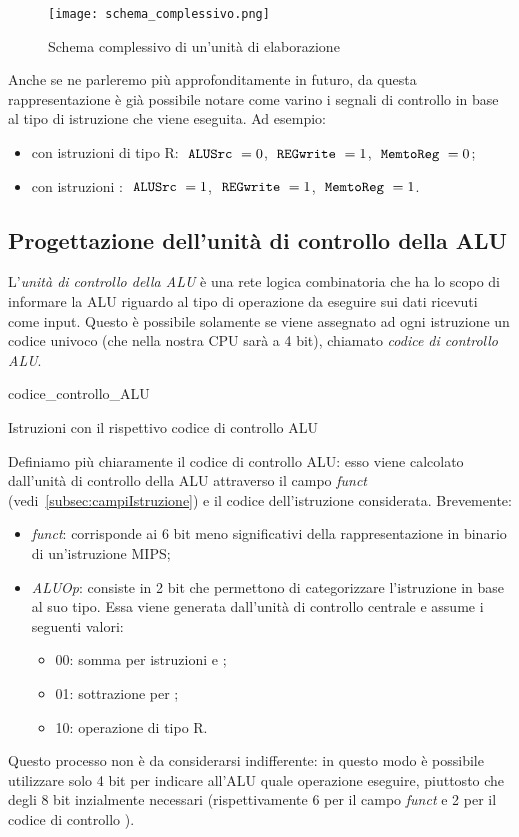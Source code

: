 \begin{figure}[H]
	\centering
	\texttt{[image: schema\_complessivo.png]}
	\caption{Schema complessivo di un'unità di elaborazione}
\end{figure}
Anche se ne parleremo più approfonditamente in futuro, da questa rappresentazione è già possibile notare come varino i segnali di controllo in base al tipo di istruzione che viene eseguita. Ad esempio:
\begin{itemize}
	\item con istruzioni di tipo R: \(\textrm{ \texttt{ALUSrc} }=0\), \(\textrm{ \texttt{REGwrite} }= 1\), \(\textrm{ \texttt{MemtoReg} }=0\);
	\item con istruzioni : \(\textrm{ \texttt{ALUSrc} }=1\), \(\textrm{ \texttt{REGwrite} }= 1\), \(\textrm{ \texttt{MemtoReg} }=1\).
\end{itemize}

\subsection{Progettazione dell'unità di controllo della ALU}
L'\emph{unità di controllo della ALU} è una rete logica combinatoria che ha lo scopo di informare la ALU riguardo al tipo di operazione da eseguire sui dati ricevuti come input. Questo è possibile solamente se viene assegnato ad ogni istruzione un codice univoco (che nella nostra CPU sarà a 4 bit), chiamato \emph{codice di controllo ALU}.

\begin{table}[H]
	\centering
	{codice_controllo_ALU}
	\caption{Istruzioni con il rispettivo codice di controllo ALU}
\end{table}
Definiamo più chiaramente il codice di controllo ALU: esso viene calcolato dall'unità di controllo della ALU attraverso il campo \emph{funct} (vedi~\ref{subsec:campiIstruzione}) e il codice  dell'istruzione considerata. Brevemente:
\begin{itemize}
	\item \emph{funct}: corrisponde ai 6 bit meno significativi della rappresentazione in binario di un'istruzione MIPS;
	\item \emph{ALUOp}: consiste in 2 bit che permettono di categorizzare l'istruzione in base al suo tipo. Essa viene generata dall'unità di controllo centrale e assume i seguenti valori:
	\begin{itemize}
		\item 00: somma per istruzioni  e ;
		\item 01: sottrazione per ;
		\item 10: operazione di tipo R.
	\end{itemize}
\end{itemize}
Questo processo non è da considerarsi indifferente: in questo modo è possibile utilizzare solo 4 bit per indicare all'ALU quale operazione eseguire, piuttosto che degli 8 bit inzialmente necessari (rispettivamente 6 per il campo \emph{funct} e 2 per il codice di controllo ).

